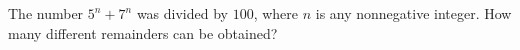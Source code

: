 The number $5^{n}+7^{n}$ was divided by $100$, where $n$ is any nonnegative integer. How many different remainders can be obtained?
